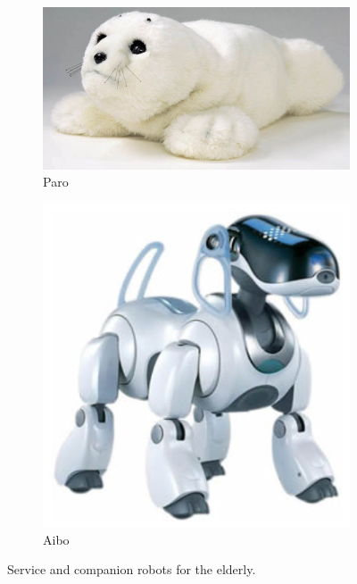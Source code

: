 \begin{figure}[h]
        \begin{subfigure}[h]{0.45\textwidth}
                \includegraphics[width=\textwidth]{./img/paro}
                \caption{Paro}
                \label{fig:paro}
        \end{subfigure}
        \begin{subfigure}[h]{0.2\textwidth}
                \includegraphics[width=\textwidth]{./img/aibo}
                \caption{Aibo}
                \label{fig:aibo}
        \end{subfigure}
        \caption{Service and companion robots for the elderly.}\label{fig:elder-robots}
\end{figure}

